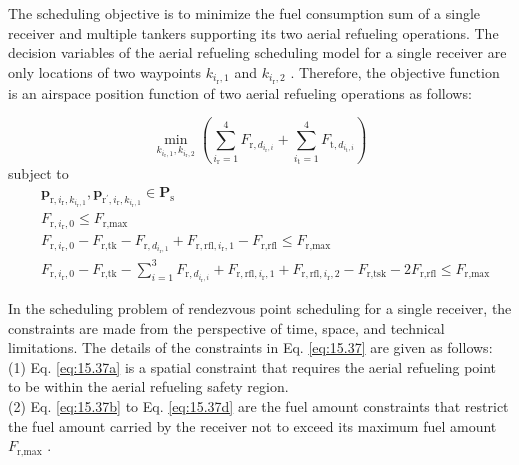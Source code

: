 The scheduling objective is to minimize the fuel consumption sum of a single receiver and multiple tankers supporting its two aerial refueling operations. The decision variables of the aerial refueling scheduling model for a single receiver are only locations of two waypoints $k_{i_{\text{r}},1}$  and $k_{i_{\text{r}},2}$ . Therefore, the objective function is an airspace position function of two aerial refueling operations as follows:


\begin{equation}
\min_{k_{i_{\text{r}},1},k_{i_{\text{r}},2}}\left(\sum_{i_{\text{r}}=1}^4F_{\text{r},d_{i_{\text{r}},i}}+\sum_{i_{\text{t}}=1}^4F_{\text{t},d_{i_{\text{t}},i}}\right)
\label{eq:15.36}
\end{equation}
subject to
\begin{subequations}
	\begin{align}
	&\mathbf{p}_{\text{r},i_{\text{r}},k_{i_{\text{r}},1}},\mathbf{p}_{\text{r}^{\prime},i_{\text{r}},k_{i_{\text{r}},1}}\in \mathbf{P}_{\text{s}}\label{eq:15.37a} \\
	&F_{\text{r},i_{\text{r}},0}\leq F_{\text{r},\text{max}} \label{eq:15.37b}\\
	&F_{\text{r},i_{\text{r}},0}-F_{\text{r},\text{tk}}-F_{\text{r},d_{i_{\text{r}},1}}+F_{\text{r},\text{r}\text{fl},i_{\text{r}},1}-F_{\text{r},\text{r}\text{fl}}\leq F_{\text{r},\text{max}} \label{eq:15.37c}\\
	&F_{\text{r},i_{\text{r}},0}-F_{\text{r},\text{tk}}-\sum_{i=1}^{3}F_{\text{r},d_{i_{\text{r}},i}}+F_{\text{r},\text{rfl},i_{\text{r}},1}+F_{\text{r},\text{rfl},i_{\text{r}},2}-F_{\text{r},\text{tsk}}-2F_{\text{r},\text{rfl}}\leq F_{\text{r},\text{max}} \label{eq:15.37d}
	\end{align}
	\label{eq:15.37}
\end{subequations}

In the scheduling problem of rendezvous point scheduling for a single receiver, the constraints are made from the perspective of time, space, and technical limitations. The details of the constraints in Eq. \ref{eq:15.37} are given as follows:\\
(1)	Eq. \ref{eq:15.37a} is a spatial constraint that requires the aerial refueling point to be within the aerial refueling safety region.\\
(2)	Eq. \ref{eq:15.37b} to Eq. \ref{eq:15.37d} are the fuel amount constraints that restrict the fuel amount carried by the receiver not to exceed its maximum fuel amount $F_{\text{r},\text{max}}$ .

